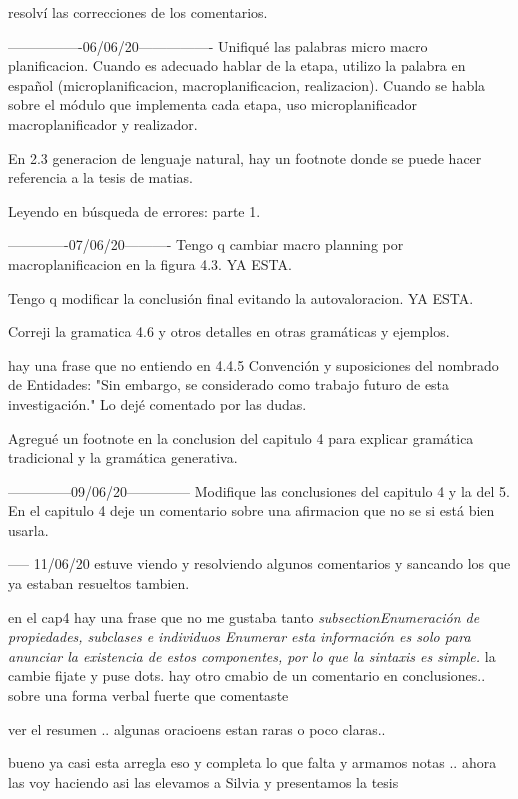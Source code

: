 resolví las correcciones de los comentarios.

----------------06/06/20----------------
Unifiqué las palabras micro macro planificacion. Cuando es adecuado hablar de la etapa, utilizo la palabra en español (microplanificacion, macroplanificacion, realizacion). Cuando se habla sobre el módulo que implementa cada etapa, uso microplanificador macroplanificador y realizador.

En 2.3 generacion de lenguaje natural, hay un footnote donde se puede hacer referencia a la tesis de matias.

Leyendo en búsqueda de errores: parte 1.


-------------07/06/20----------
Tengo q cambiar macro planning por macroplanificacion en la figura 4.3. YA ESTA.

Tengo q modificar la conclusión final evitando la autovaloracion. YA ESTA.

Correji la gramatica 4.6 y otros detalles en otras gramáticas y ejemplos.

hay una frase que no entiendo en 4.4.5 Convención y suposiciones del nombrado de Entidades: "Sin embargo, se considerado como trabajo futuro de esta investigación." Lo dejé comentado por las dudas. 

Agregué un footnote en la conclusion del capitulo 4 para explicar gramática tradicional y la gramática generativa.

--------------09/06/20--------------
Modifique las conclusiones del capitulo 4 y la del 5. En el capitulo 4 deje un comentario sobre una afirmacion que no se si está bien usarla. 

----- 11/06/20
estuve viendo y resolviendo algunos comentarios y sancando los que ya estaban resueltos tambien. 

en el cap4 hay una frase que no me gustaba tanto 
\textit{subsection{Enumeración de propiedades, subclases e individuos}
Enumerar esta información es solo para anunciar la existencia de estos componentes, por lo que la sintaxis es simple.
}
la cambie fijate y puse dots. 
hay otro cmabio de un comentario en conclusiones.. sobre una forma verbal fuerte que comentaste

ver el resumen .. algunas oracioens estan raras o poco claras..

bueno ya casi esta arregla eso y completa lo que falta y armamos notas .. ahora las voy haciendo asi las elevamos a Silvia y presentamos la tesis